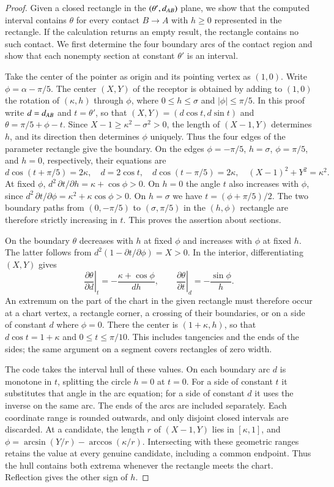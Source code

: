 \begin{proof}
Given a closed rectangle in the $(\theta',d_{AB})$ plane, we show
that the computed interval contains $\theta$ for every contact $B\to A$
with $h\ge0$ represented in the rectangle. If the calculation returns
an empty result, the rectangle contains no such contact. We first
determine the four boundary arcs of the contact region and show that
each nonempty section at constant $\theta'$ is an interval.

Take the center of the pointer as origin and its pointing vertex as
$(1,0)$. Write $\phi=\alpha-\pi/5$. The center $(X,Y)$ of the
receptor is obtained by adding to $(1,0)$ the rotation of $(\kappa,h)$
through $\phi$, where $0\le h\le\sigma$ and $|\phi|\le\pi/5$.
In this proof write $d=d_{AB}$ and $t=\theta'$, so that
$(X,Y)=(d\cos t,d\sin t)$ and $\theta=\pi/5+\phi-t$.
Since $X-1\ge\kappa^2-\sigma^2>0$, the length of $(X-1,Y)$
determines $h$, and its direction then determines $\phi$ uniquely.
Thus the four edges of the parameter rectangle give the boundary.
On the edges $\phi=-\pi/5$, $h=\sigma$, $\phi=\pi/5$, and $h=0$,
respectively, their equations are
\[
 d\cos(t+\pi/5)=2\kappa,\quad d=2\cos t,\quad
 d\cos(t-\pi/5)=2\kappa,\quad (X-1)^2+Y^2=\kappa^2 .
\]
At fixed $\phi$, $d^2\,\partial t/\partial h=\kappa+\cos\phi>0$.
On $h=0$ the angle $t$ also increases with $\phi$, since
$d^2\,\partial t/\partial\phi=\kappa^2+\kappa\cos\phi>0$.
On $h=\sigma$ we have $t=(\phi+\pi/5)/2$.
The two boundary paths from $(0,-\pi/5)$ to $(\sigma,\pi/5)$
in the $(h,\phi)$ rectangle are therefore strictly increasing in $t$.
This proves the assertion about sections.

On the boundary $\theta$ decreases with $h$ at fixed $\phi$ and
increases with $\phi$ at fixed $h$. The latter follows from
$d^2(1-\partial t/\partial\phi)=X>0$.
In the interior, differentiating $(X,Y)$ gives
\[
 \left.\frac{\partial\theta}{\partial d}\right|_t
 =-\frac{\kappa+\cos\phi}{dh},\qquad
 \left.\frac{\partial\theta}{\partial t}\right|_d
 =-\frac{\sin\phi}{h}.
\]
An extremum on the part of the chart in the given rectangle must
therefore occur at a chart vertex, a rectangle corner, a crossing of
their boundaries, or on a side of constant $d$ where $\phi=0$.
There the center is $(1+\kappa,h)$, so that $d\cos t=1+\kappa$
and $0\le t\le\pi/10$. This includes tangencies and the ends of the
sides; the same argument on a segment covers rectangles of zero width.

The code takes the interval hull of these values. On each boundary
arc $d$ is monotone in $t$, splitting the circle $h=0$ at $t=0$.
For a side of constant $t$ it substitutes that angle in the arc
equation; for a side of constant $d$ it uses the inverse on the same
arc. The ends of the arcs are included separately. Each coordinate
range is rounded outwards, and only disjoint closed intervals are
discarded. At a candidate, the length $r$ of $(X-1,Y)$ lies in
$[\kappa,1]$, and
$\phi=\arcsin(Y/r)-\arccos(\kappa/r)$. Intersecting with these
geometric ranges retains the value at every genuine candidate,
including a common endpoint. Thus the hull contains both extrema
whenever the rectangle meets the chart. Reflection gives the other
sign of $h$.
\end{proof}


